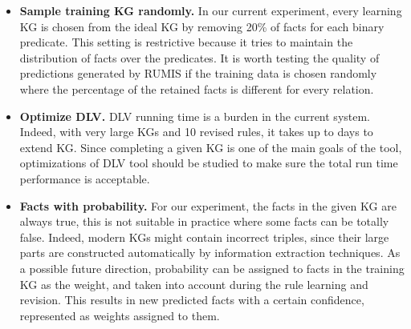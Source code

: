\begin{itemize}
\item \textbf{Sample training KG randomly.} In our current experiment, every learning KG is chosen from the ideal KG by removing 20\% of facts for each binary predicate. This setting is restrictive because it tries to maintain the distribution of facts over the predicates. It is worth testing the quality of predictions generated by RUMIS if the training data is chosen randomly where the percentage of the retained facts is different for every relation.
\item \textbf{Optimize DLV.} DLV running time is a burden in the current system. Indeed, with very large KGs and 10 revised rules, it takes up to days to extend KG. Since completing a given KG is one of the main goals of the tool, optimizations of DLV tool should be studied to make sure the total run time performance is acceptable.
\item \textbf{Facts with probability.} For our experiment, the facts in the given KG are always true, this is not suitable in practice where some facts can be totally false. Indeed, modern KGs might contain incorrect triples, since their large parts are constructed automatically by information extraction techniques. As a possible future direction, probability can be assigned to facts in the training KG as the weight, and taken into account during the rule learning and revision. This results in new predicted facts with a certain confidence, represented as weights assigned to them.
\end{itemize}